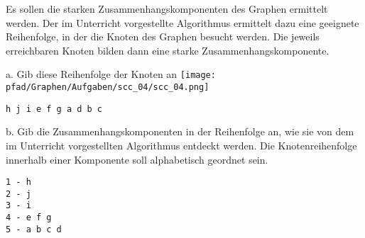 \question[5]
Es sollen die starken Zusammenhangskomponenten des Graphen ermittelt werden.
Der im Unterricht vorgestellte Algorithmus ermittelt dazu eine
geeignete Reihenfolge, in der die Knoten des Graphen besucht werden. Die
jeweils erreichbaren Knoten bilden dann eine starke Zusammenhangskomponente.

a. Gib diese Reihenfolge der Knoten an
\texttt{[image: \\pfad/Graphen/Aufgaben/scc\_04/scc\_04.png]}
\begin{solutionbox}{2cm}
\begin{lstlisting}
h j i e f g a d b c
\end{lstlisting}
\end{solutionbox}

b. Gib die Zusammenhangskomponenten in der Reihenfolge an, wie sie von
dem im Unterricht vorgestellten Algorithmus entdeckt werden.
Die Knotenreihenfolge innerhalb einer Komponente soll
alphabetisch geordnet sein.
\begin{solutionbox}{4cm}
\begin{lstlisting}
1 - h
2 - j
3 - i
4 - e f g
5 - a b c d
\end{lstlisting}
\end{solutionbox}
